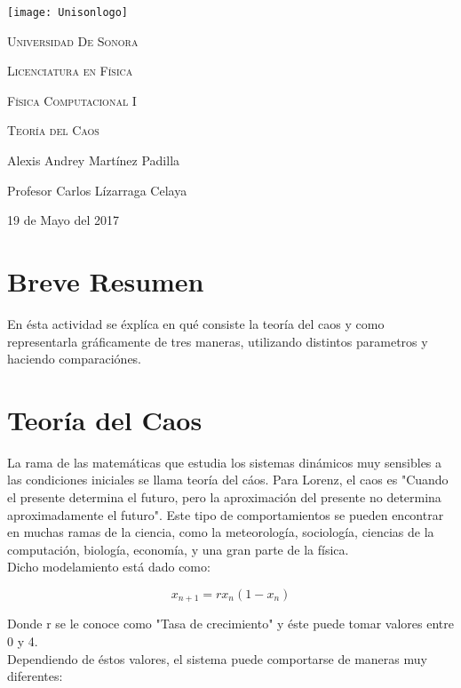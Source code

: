 \documentclass[12pt,a4paper]{article}
\begin{document}
\begin{titlepage}
	\centering
	\texttt{[image: Unisonlogo]}\par
    \vspace{1.3cm}
	\scshape \LARGE Universidad De Sonora \par
	\vspace{1cm}
	\scshape \Large Licenciatura en Física \par
    \scshape \Large Física Computacional I \par
	\vspace{1.5cm}
	\huge \scshape Teoría del Caos \par
	\vspace{2cm}
	\Large Alexis Andrey Martínez Padilla\par
    \Large Profesor Carlos Lízarraga Celaya\par
    \vspace{2.5cm}
    \Large 19 de Mayo del 2017
\end{titlepage}

\section{Breve Resumen}
En ésta actividad se éxplíca en qué consiste la teoría del caos y como representarla gráficamente de tres maneras, utilizando distintos parametros y haciendo comparaciónes.

\section{Teoría del Caos}
La rama de las matemáticas que estudia los sistemas dinámicos muy sensibles a las condiciones iniciales se llama teoría del cáos. Para Lorenz, el caos es "Cuando el presente determina el futuro, pero la aproximación del presente no determina aproximadamente el futuro". Este tipo de comportamientos se pueden encontrar en muchas ramas de la ciencia, como la meteorología, sociología, ciencias de la computación, biología, economía, y una gran parte de la física. \\

Dicho modelamiento está dado como:

$$x_{n+1} = r x_n (1-x_n)$$

Donde r se le conoce como "Tasa de crecimiento" y éste puede tomar valores entre 0 y 4. \\

Dependiendo de éstos valores, el sistema puede comportarse de maneras muy diferentes: \\
\end{document}
